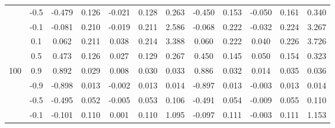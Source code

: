\begin{table}[h]
{\begin{tabular}{|c|cccccc|ccccc|}
     & \multicolumn{1}{c|}{-0.5} & \multicolumn{1}{c|}{-0.479} & \multicolumn{1}{c|}{0.126} & \multicolumn{1}{c|}{-0.021} & \multicolumn{1}{c|}{0.128} & 0.263 & \multicolumn{1}{c|}{-0.450} & \multicolumn{1}{c|}{0.153} & \multicolumn{1}{c|}{-0.050} & \multicolumn{1}{c|}{0.161} & 0.340 \\ \cline{2-12} 
     & \multicolumn{1}{c|}{-0.1} & \multicolumn{1}{c|}{-0.081} & \multicolumn{1}{c|}{0.210} & \multicolumn{1}{c|}{-0.019} & \multicolumn{1}{c|}{0.211} & 2.586 & \multicolumn{1}{c|}{-0.068} & \multicolumn{1}{c|}{0.222} & \multicolumn{1}{c|}{-0.032} & \multicolumn{1}{c|}{0.224} & 3.267 \\ \cline{2-12} 
     & \multicolumn{1}{c|}{0.1} & \multicolumn{1}{c|}{0.062} & \multicolumn{1}{c|}{0.211} & \multicolumn{1}{c|}{0.038} & \multicolumn{1}{c|}{0.214} & 3.388 & \multicolumn{1}{c|}{0.060} & \multicolumn{1}{c|}{0.222} & \multicolumn{1}{c|}{0.040} & \multicolumn{1}{c|}{0.226} & 3.726 \\ \cline{2-12} 
     & \multicolumn{1}{c|}{0.5} & \multicolumn{1}{c|}{0.473} & \multicolumn{1}{c|}{0.126} & \multicolumn{1}{c|}{0.027} & \multicolumn{1}{c|}{0.129} & 0.267 & \multicolumn{1}{c|}{0.450} & \multicolumn{1}{c|}{0.145} & \multicolumn{1}{c|}{0.050} & \multicolumn{1}{c|}{0.154} & 0.323 \\ \cline{2-12} 
    \multirow{-6}{*}{100} & \multicolumn{1}{c|}{0.9} & \multicolumn{1}{c|}{0.892} & \multicolumn{1}{c|}{0.029} & \multicolumn{1}{c|}{0.008} & \multicolumn{1}{c|}{0.030} & 0.033 & \multicolumn{1}{c|}{0.886} & \multicolumn{1}{c|}{0.032} & \multicolumn{1}{c|}{0.014} & \multicolumn{1}{c|}{0.035} & 0.036 \\ \hline
     & \multicolumn{1}{c|}{-0.9} & \multicolumn{1}{c|}{-0.898} & \multicolumn{1}{c|}{0.013} & \multicolumn{1}{c|}{-0.002} & \multicolumn{1}{c|}{0.013} & 0.014 & \multicolumn{1}{c|}{-0.897} & \multicolumn{1}{c|}{0.013} & \multicolumn{1}{c|}{-0.003} & \multicolumn{1}{c|}{0.013} & 0.014 \\ \cline{2-12} 
     & \multicolumn{1}{c|}{-0.5} & \multicolumn{1}{c|}{-0.495} & \multicolumn{1}{c|}{0.052} & \multicolumn{1}{c|}{-0.005} & \multicolumn{1}{c|}{0.053} & 0.106 & \multicolumn{1}{c|}{-0.491} & \multicolumn{1}{c|}{0.054} & \multicolumn{1}{c|}{-0.009} & \multicolumn{1}{c|}{0.055} & 0.110 \\ \cline{2-12} 
     & \multicolumn{1}{c|}{-0.1} & \multicolumn{1}{c|}{-0.101} & \multicolumn{1}{c|}{0.110} & \multicolumn{1}{c|}{0.001} & \multicolumn{1}{c|}{0.110} & 1.095 & \multicolumn{1}{c|}{-0.097} & \multicolumn{1}{c|}{0.111} & \multicolumn{1}{c|}{-0.003} & \multicolumn{1}{c|}{0.111} & 1.153 \\ \cline{2-12} 

\end{tabular}}
\end{table}
